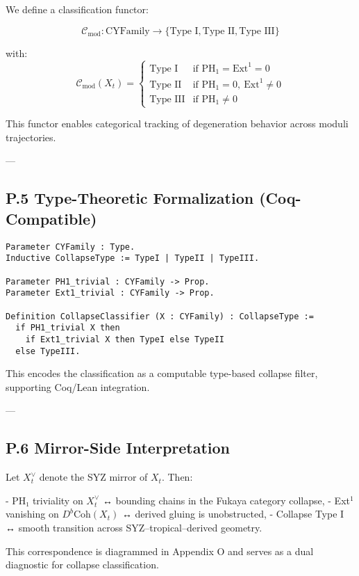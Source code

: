 \documentclass[11pt]{article}
\begin{document}
\begin{axiom}
\begin{axiom}
{{We define a classification functor:

\[
\mathcal{C}_{\text{mod}} : \mathrm{CYFamily} \to \{ \text{Type I}, \text{Type II}, \text{Type III} \}
\]

with:
\[
\mathcal{C}_{\text{mod}}(X_t) =
\begin{cases}
\text{Type I} & \text{if } \mathrm{PH}_1 = \mathrm{Ext}^1 = 0 \\
\text{Type II} & \text{if } \mathrm{PH}_1 = 0,\ \mathrm{Ext}^1 \neq 0 \\
\text{Type III} & \text{if } \mathrm{PH}_1 \neq 0
\end{cases}
\]

This functor enables categorical tracking of degeneration behavior across moduli trajectories.

---

\subsection*{P.5 Type-Theoretic Formalization (Coq-Compatible)}

\begin{lstlisting}[language=Coq]
Parameter CYFamily : Type.
Inductive CollapseType := TypeI | TypeII | TypeIII.

Parameter PH1_trivial : CYFamily -> Prop.
Parameter Ext1_trivial : CYFamily -> Prop.

Definition CollapseClassifier (X : CYFamily) : CollapseType :=
  if PH1_trivial X then
    if Ext1_trivial X then TypeI else TypeII
  else TypeIII.
\end{lstlisting}

This encodes the classification as a computable type-based collapse filter, supporting Coq/Lean integration.

---

\subsection*{P.6 Mirror-Side Interpretation}

Let \( X^\vee_t \) denote the SYZ mirror of \( X_t \). Then:

- PH₁ triviality on \( X_t^\vee \) ↔ bounding chains in the Fukaya category collapse,
- Ext$^1$ vanishing on \( D^b\mathrm{Coh}(X_t) \) ↔ derived gluing is unobstructed,
- Collapse Type I ↔ smooth transition across SYZ–tropical–derived geometry.

This correspondence is diagrammed in Appendix O and serves as a dual diagnostic for collapse classification.

}}
\end{axiom}
\end{axiom}
\end{document}
